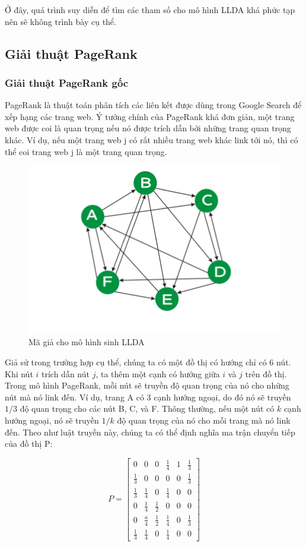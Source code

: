 \documentclass[12pt,a4paper]{article}
\begin{document}
Ở đây, quá trình suy diễn để tìm các tham số cho mô hình LLDA khá phức tạp nên sẽ không trình bày cụ thể.

\newpage
\subsection{Giải thuật PageRank}
\subsubsection{Giải thuật PageRank gốc}
PageRank là thuật toán phân tích các liên kết được dùng trong Google Search để xếp hạng các trang web. Ý tưởng chính của PageRank khá đơn giản, một trang web được coi là quan trọng nếu nó được trích dẫn bởi những trang quan trọng khác. Ví dụ, nếu một trang web j có rất nhiều trang web khác link tới nó, thì có thể coi trang web j là một trang quan trọng.


\begin{figure}[h]
    \centering
    \includegraphics[width=.4\textwidth]{pagerank}
    \caption{Mã giả cho mô hình sinh LLDA}
    \label{fig:lldapseudo}
\end{figure}

Giả sử trong trường hợp cụ thể, chúng ta có một đồ thị có hướng chỉ có 6 nút. Khi nút $i$ trích dẫn nút $j$, ta thêm một cạnh có hướng giữa $i$ và $j$ trên đồ thị. Trong mô hình PageRank, mỗi nút sẽ truyền độ quan trọng của nó cho những nút mà nó link đến. Ví dụ, trang A có 3 cạnh hướng ngoại, do đó nó sẽ truyền $1/3$ độ quan trọng cho các nút B, C, và F. Thông thường, nếu một nút có $k$ cạnh hướng ngoại, nó sẽ truyền $1/k$ độ quan trọng của nó cho mỗi trang mà nó link đến. Theo như luật truyền này, chúng ta có thể định nghĩa ma trận chuyển tiếp của đồ thị P:

$$
P = 
\begin{bmatrix}
    0 & 0 & 0 & \frac{1}{4} & 1 & \frac{1}{3} \\
    \frac{1}{3} & 0 & 0 & 0 & 0 & \frac{1}{3} \\
    \frac{1}{3} & \frac{1}{4} & 0 & \frac{1}{4} & 0 & 0 \\
    0 & \frac{1}{4} & \frac{1}{2} & 0 & 0 & 0 \\
    0 & \frac{a}{4} & \frac{1}{2} & \frac{1}{4} & 0 & \frac{1}{3} \\
    \frac{1}{3} & \frac{1}{4} & 0 & \frac{1}{4} & 0 & 0
\end{bmatrix}
$$
\end{document}
